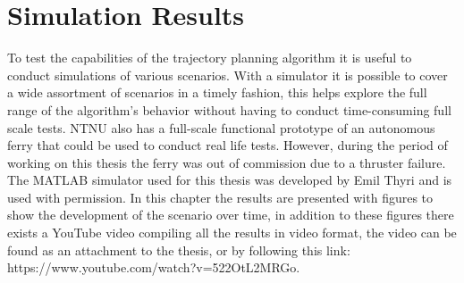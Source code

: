 \section{Simulation Results}


To test the capabilities of the trajectory planning algorithm it is useful to conduct simulations of various scenarios.
With a simulator it is possible to cover a wide assortment of scenarios in a timely fashion, this helps explore the full
range of the algorithm's behavior without having to conduct time-consuming full scale tests. NTNU also has a full-scale
functional prototype of an autonomous ferry that could be used to conduct real life tests. However, during the period of working
on this thesis the ferry was out of commission due to a thruster failure.
The MATLAB simulator used for this thesis was developed by Emil Thyri and is used with permission. In this chapter the results
are presented with figures to show the development of the scenario over time, in addition to these figures there exists a YouTube video compiling
all the results in video format, the video can be found as an attachment to the thesis, or by following this link: https://www.youtube.com/watch?v=522OtL2MRGo.


